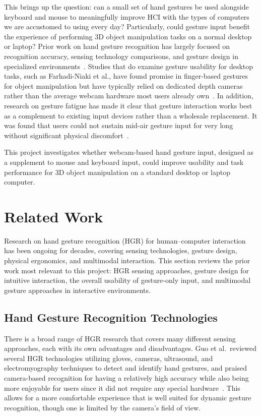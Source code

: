 \documentclass[sigconf]{acmart}
\begin{document}
This brings up the question: can a small set of hand gestures be used alongside keyboard and mouse to meaningfully improve HCI with the types of computers we are accustomed to using every day? Particularly, could gesture input benefit the experience of performing 3D object manipulation tasks on a normal desktop or laptop? Prior work on hand gesture recognition has largely focused on recognition accuracy, sensing technology comparisons, and gesture design in specialized environments~\cite{guo2021, rautaray2015}. Studies that do examine gesture usability for desktop tasks, such as Farhadi-Niaki et al., have found promise in finger-based gestures for object manipulation but have typically relied on dedicated depth cameras rather than the average webcam hardware most users already own~\cite{farhadi2013}. In addition, research on gesture fatigue has made it clear that gesture interaction works best as a complement to existing input devices rather than a wholesale replacement. It was found that users could not sustain mid-air gesture input for very long without significant physical discomfort~\cite{hansberger2017}.

This project investigates whether webcam-based hand gesture input, designed as a supplement to mouse and keyboard input, could improve usability and task performance for 3D object manipulation on a standard desktop or laptop computer.

\section{Related Work}

Research on hand gesture recognition (HGR) for human–computer interaction has been ongoing for decades, covering sensing technologies, gesture design, physical ergonomics, and multimodal interaction. This section reviews the prior work most relevant to this project: HGR sensing approaches, gesture design for intuitive interaction, the overall usability of gesture-only input, and multimodal gesture approaches in interactive environments.

\subsection{Hand Gesture Recognition Technologies}

There is a broad range of HGR research that covers many different sensing approaches, each with its own advantages and disadvantages. Guo et al.\ reviewed several HGR technologies utilizing gloves, cameras, ultrasound, and electromyography techniques to detect and identify hand gestures, and praised camera-based recognition for having a relatively high accuracy while also being more enjoyable for users since it did not require any special hardware~\cite{guo2021}. This allows for a more comfortable experience that is well suited for dynamic gesture recognition, though one is limited by the camera's field of view.
\end{document}
